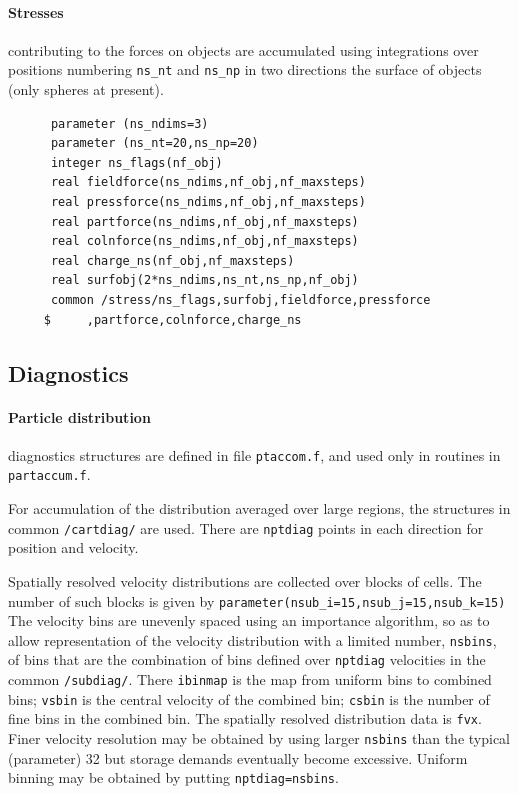 \documentclass[12pt]{article}
\begin{document}
\paragraph{Stresses} contributing to the forces on objects are
accumulated using integrations over positions numbering \verb!ns_nt! and
\verb!ns_np! in two directions the surface of objects (only
spheres at present). 
\begin{verbatim}
      parameter (ns_ndims=3)
      parameter (ns_nt=20,ns_np=20)
      integer ns_flags(nf_obj)
      real fieldforce(ns_ndims,nf_obj,nf_maxsteps)
      real pressforce(ns_ndims,nf_obj,nf_maxsteps)
      real partforce(ns_ndims,nf_obj,nf_maxsteps)
      real colnforce(ns_ndims,nf_obj,nf_maxsteps)
      real charge_ns(nf_obj,nf_maxsteps)
      real surfobj(2*ns_ndims,ns_nt,ns_np,nf_obj)
      common /stress/ns_flags,surfobj,fieldforce,pressforce
     $     ,partforce,colnforce,charge_ns

\end{verbatim}

\subsection{Diagnostics}

\paragraph{Particle distribution} diagnostics structures are defined in file
\verb!ptaccom.f!, and used only in routines in \verb!partaccum.f!. 

For accumulation of the distribution averaged over large regions, the
structures in common \verb!/cartdiag/! are used.  There are
\verb!nptdiag! points in each direction for position and velocity.
 
Spatially resolved velocity distributions
are collected over blocks of cells. The number of such blocks is given
by \verb!parameter(nsub_i=15,nsub_j=15,nsub_k=15)!  The velocity bins
are unevenly spaced using an importance algorithm, so as to allow
representation of the velocity distribution with a limited number,
\verb!nsbins!, of bins that are the combination of bins defined over
\verb!nptdiag! velocities in the common \verb!/subdiag/!.  There
\verb!ibinmap! is the map from uniform bins to combined bins;
\verb!vsbin! is the central velocity of the combined bin; \verb!csbin!
is the number of fine bins in the combined bin. The spatially resolved
distribution data is \verb!fvx!. Finer velocity resolution may be
obtained by using larger \verb!nsbins! than the typical (parameter) 32
but storage demands eventually become excessive.  Uniform binning
may be obtained by putting \verb!nptdiag=nsbins!.
\end{document}

